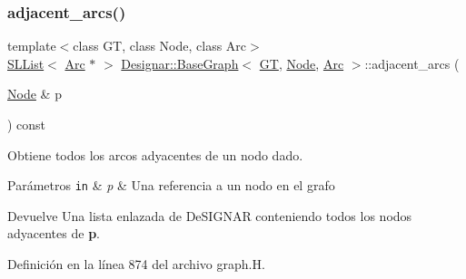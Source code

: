 \subsubsection{\texorpdfstring{adjacent\+\_\+arcs()}{adjacent\_arcs()}}
{\footnotesize\ttfamily template$<$class GT, class Node, class Arc$>$ \\
\hyperlink{class_designar_1_1_s_l_list}{S\+L\+List}$<$ \hyperlink{namespace_designar_a3f55fb5513d62ff47cbc8f72b8e95d6f}{Arc} $\ast$ $>$ \hyperlink{class_designar_1_1_base_graph}{Designar\+::\+Base\+Graph}$<$ \hyperlink{demo-buildgraph_8_c_a3001c40d2c31ca87ed96cd7d1334a55e}{GT}, \hyperlink{namespace_designar_a5af326c65aa2bd26b26c410f2030d09e}{Node}, \hyperlink{namespace_designar_a3f55fb5513d62ff47cbc8f72b8e95d6f}{Arc} $>$\+::adjacent\+\_\+arcs (\begin{DoxyParamCaption}\item[{\hyperlink{namespace_designar_a5af326c65aa2bd26b26c410f2030d09e}{Node} \&}]{p }\end{DoxyParamCaption}) const\hspace{0.3cm}{\ttfamily [inline]}}



Obtiene todos los arcos adyacentes de un nodo dado. 


\begin{DoxyParams}[1]{Parámetros}
\mbox{\tt in}  & {\em p} & Una referencia a un nodo en el grafo \\
\hline
\end{DoxyParams}
\begin{DoxyReturn}{Devuelve}
Una lista enlazada de De\+S\+I\+G\+N\+AR conteniendo todos los nodos adyacentes de {\bfseries p}. 
\end{DoxyReturn}


Definición en la línea 874 del archivo graph.\+H.

\mbox{\label{class_designar_1_1_base_graph_af7a57a1088105a79466546620bf830b3}} 
